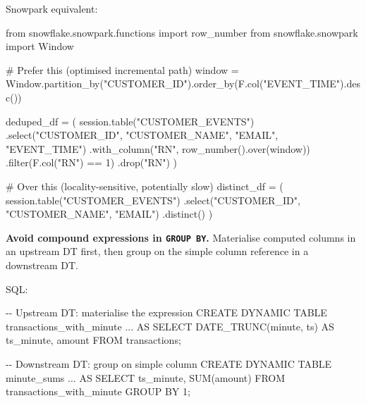 \documentclass[
  letterpaper,
  DIV=11,
  numbers=noendperiod]{scrreprt}
\newenvironment{Shaded}{\begin{snugshade}}{\end{snugshade}}
\newcommand{\BuiltInTok}[1]{\textcolor[rgb]{0.00,0.23,0.31}{#1}}
\newcommand{\CommentTok}[1]{\textcolor[rgb]{0.37,0.37,0.37}{#1}}
\newcommand{\DecValTok}[1]{\textcolor[rgb]{0.68,0.00,0.00}{#1}}
\newcommand{\FunctionTok}[1]{\textcolor[rgb]{0.28,0.35,0.67}{#1}}
\newcommand{\ImportTok}[1]{\textcolor[rgb]{0.00,0.46,0.62}{#1}}
\newcommand{\KeywordTok}[1]{\textcolor[rgb]{0.00,0.23,0.31}{#1}}
\newcommand{\NormalTok}[1]{\textcolor[rgb]{0.00,0.23,0.31}{#1}}
\newcommand{\OperatorTok}[1]{\textcolor[rgb]{0.37,0.37,0.37}{#1}}
\newcommand{\StringTok}[1]{\textcolor[rgb]{0.13,0.47,0.30}{#1}}
\begin{document}
Snowpark equivalent:

\begin{Shaded}
\begin{Highlighting}[]
\ImportTok{from}\NormalTok{ snowflake.snowpark.functions }\ImportTok{import}\NormalTok{ row\_number}
\ImportTok{from}\NormalTok{ snowflake.snowpark }\ImportTok{import}\NormalTok{ Window}

\CommentTok{\# Prefer this (optimised incremental path)}
\NormalTok{window }\OperatorTok{=}\NormalTok{ Window.partition\_by(}\StringTok{"CUSTOMER\_ID"}\NormalTok{).order\_by(F.col(}\StringTok{"EVENT\_TIME"}\NormalTok{).desc())}

\NormalTok{deduped\_df }\OperatorTok{=}\NormalTok{ (}
\NormalTok{    session.table(}\StringTok{"CUSTOMER\_EVENTS"}\NormalTok{)}
\NormalTok{    .select(}\StringTok{"CUSTOMER\_ID"}\NormalTok{, }\StringTok{"CUSTOMER\_NAME"}\NormalTok{, }\StringTok{"EMAIL"}\NormalTok{, }\StringTok{"EVENT\_TIME"}\NormalTok{)}
\NormalTok{    .with\_column(}\StringTok{"RN"}\NormalTok{, row\_number().over(window))}
\NormalTok{    .}\BuiltInTok{filter}\NormalTok{(F.col(}\StringTok{"RN"}\NormalTok{) }\OperatorTok{==} \DecValTok{1}\NormalTok{)}
\NormalTok{    .drop(}\StringTok{"RN"}\NormalTok{)}
\NormalTok{)}

\CommentTok{\# Over this (locality{-}sensitive, potentially slow)}
\NormalTok{distinct\_df }\OperatorTok{=}\NormalTok{ (}
\NormalTok{    session.table(}\StringTok{"CUSTOMER\_EVENTS"}\NormalTok{)}
\NormalTok{    .select(}\StringTok{"CUSTOMER\_ID"}\NormalTok{, }\StringTok{"CUSTOMER\_NAME"}\NormalTok{, }\StringTok{"EMAIL"}\NormalTok{)}
\NormalTok{    .distinct()}
\NormalTok{)}
\end{Highlighting}
\end{Shaded}

\textbf{Avoid compound expressions in \texttt{GROUP\ BY}.} Materialise
computed columns in an upstream DT first, then group on the simple
column reference in a downstream DT.

SQL:

\begin{Shaded}
\begin{Highlighting}[]
\CommentTok{{-}{-} Upstream DT: materialise the expression}
\KeywordTok{CREATE} \KeywordTok{DYNAMIC} \KeywordTok{TABLE}\NormalTok{ transactions\_with\_minute }\OperatorTok{..}\NormalTok{.}
\KeywordTok{AS} \KeywordTok{SELECT}\NormalTok{ DATE\_TRUNC(}\StringTok{\textquotesingle{}minute\textquotesingle{}}\NormalTok{, ts) }\KeywordTok{AS}\NormalTok{ ts\_minute, amount}
   \KeywordTok{FROM}\NormalTok{ transactions;}

\CommentTok{{-}{-} Downstream DT: group on simple column}
\KeywordTok{CREATE} \KeywordTok{DYNAMIC} \KeywordTok{TABLE}\NormalTok{ minute\_sums }\OperatorTok{..}\NormalTok{.}
\KeywordTok{AS} \KeywordTok{SELECT}\NormalTok{ ts\_minute, }\FunctionTok{SUM}\NormalTok{(amount)}
   \KeywordTok{FROM}\NormalTok{ transactions\_with\_minute}
   \KeywordTok{GROUP} \KeywordTok{BY} \DecValTok{1}\NormalTok{;}
\end{Highlighting}
\end{Shaded}
\end{document}
